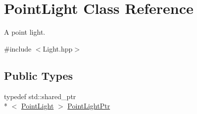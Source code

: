 \hypertarget{classPointLight}{\section{Point\+Light Class Reference}
\label{classPointLight}
}


A point light.  




{\ttfamily \#include $<$Light.\+hpp$>$}

\subsection*{Public Types}
\begin{DoxyCompactItemize}
\item 
typedef std\+::shared\+\_\+ptr\\*
$<$ \hyperlink{classPointLight}{Point\+Light} $>$ \hyperlink{classPointLight_a48c8893ebd8015da2cb3d552f800e4e7}{Point\+Light\+Ptr}
\end{DoxyCompactItemize}
